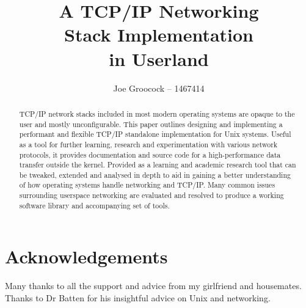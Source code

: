 \documentclass[11pt,a4paper,british,twocolumn]{bhamreport}
\title{A TCP/IP Networking\\Stack Implementation\\in Userland}
\author{Joe Groocock -- 1467414} %
\begin{document}
\maketitle

\begingroup
\let\onecolumn\twocolumn
\tableofcontents
\endgroup

\begin{abstract}
TCP/IP network stacks included in most modern operating systems are opaque to the user and mostly unconfigurable. This paper outlines designing and implementing a performant and flexible TCP/IP standalone implementation for Unix systems. Useful as a tool for further learning, research and experimentation with various network protocols, it provides documentation and source code for a high-performance data transfer outside the kernel. Provided as a learning and academic research tool that can be tweaked, extended and analysed in depth to aid in gaining a better understanding of how operating systems handle networking and TCP/IP\@. Many common issues surrounding userspace networking are evaluated and resolved to produce a working software library and accompanying set of tools.
\end{abstract}

\section*{Acknowledgements}
Many thanks to all the support and advice from my girlfriend and housemates. Thanks to Dr Batten for his insightful advice on Unix and networking.

\twocolumn














\printbibliography %

\end{document}
